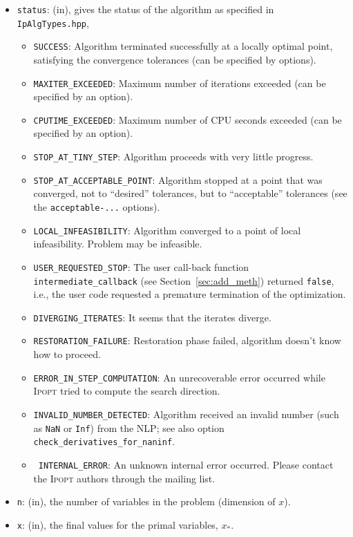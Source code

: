 \documentclass[10pt]{article}
\newcommand{\Ipopt}{\textsc{Ipopt}\xspace}
\begin{document}
\begin{itemize}
\item {\tt status}: (in), gives the status of the algorithm as
  specified in {\tt IpAlgTypes.hpp},
  \begin{itemize}
  \item {\tt SUCCESS}: Algorithm terminated successfully at a locally
    optimal point, satisfying the convergence tolerances (can be
    specified by options).
  \item {\tt MAXITER\_EXCEEDED}: Maximum number of iterations exceeded
    (can be specified by an option).
  \item {\tt CPUTIME\_EXCEEDED}: Maximum number of CPU seconds exceeded
    (can be specified by an option).
  \item {\tt STOP\_AT\_TINY\_STEP}: Algorithm proceeds with very
    little progress.
  \item {\tt STOP\_AT\_ACCEPTABLE\_POINT}: Algorithm stopped at a
    point that was converged, not to ``desired'' tolerances, but to
    ``acceptable'' tolerances (see the {\tt acceptable-...} options).
  \item {\tt LOCAL\_INFEASIBILITY}: Algorithm converged to a point of
    local infeasibility. Problem may be infeasible.
  \item {\tt USER\_REQUESTED\_STOP}: The user call-back function {\tt
      intermediate\_callback} (see Section~\ref{sec:add_meth})
    returned {\tt false}, i.e., the user code requested a premature
    termination of the optimization.
  \item {\tt DIVERGING\_ITERATES}: It seems that the iterates diverge.
  \item {\tt RESTORATION\_FAILURE}: Restoration phase failed,
    algorithm doesn't know how to proceed.
  \item {\tt ERROR\_IN\_STEP\_COMPUTATION}: An unrecoverable error
    occurred while \Ipopt tried to compute the search direction.
  \item {\tt INVALID\_NUMBER\_DETECTED}:  Algorithm received an
    invalid number (such as {\tt NaN} or {\tt Inf}) from the NLP; see
    also option {\tt check\_derivatives\_for\_naninf}.
  \item {\tt
      INTERNAL\_ERROR}: An unknown internal error occurred.  Please
    contact the \Ipopt authors through the mailing list.
  \end{itemize}
\item {\tt n}: (in), the number of variables in the problem (dimension
  of $x$).
\item {\tt x}: (in), the final values for the primal variables, $x_*$.

\end{itemize}
\end{document}
